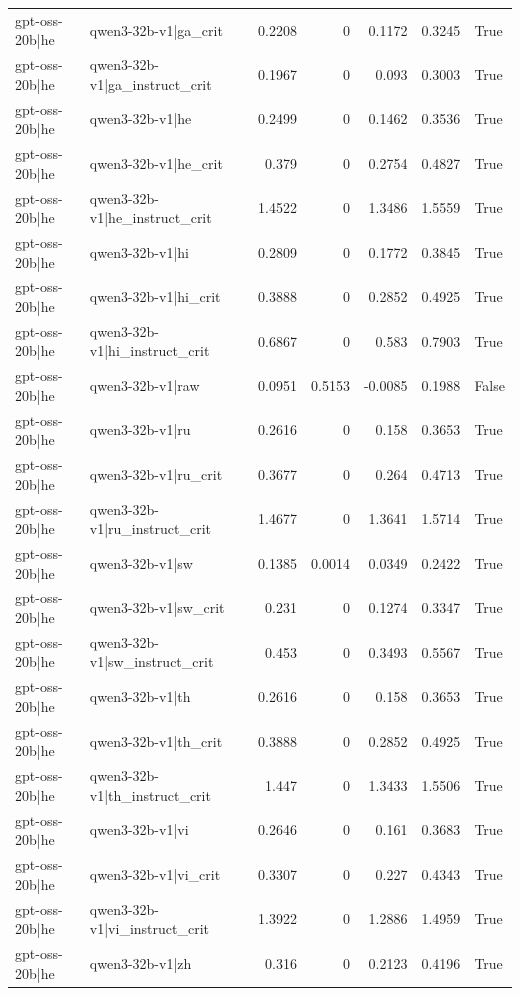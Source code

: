 \begin{table}
\begin{tabular}{l l r r r r l}
gpt-oss-20b|he & qwen3-32b-v1|ga_crit & 0.2208 & 0 & 0.1172 & 0.3245 & True \\
gpt-oss-20b|he & qwen3-32b-v1|ga_instruct_crit & 0.1967 & 0 & 0.093 & 0.3003 & True \\
gpt-oss-20b|he & qwen3-32b-v1|he & 0.2499 & 0 & 0.1462 & 0.3536 & True \\
gpt-oss-20b|he & qwen3-32b-v1|he_crit & 0.379 & 0 & 0.2754 & 0.4827 & True \\
gpt-oss-20b|he & qwen3-32b-v1|he_instruct_crit & 1.4522 & 0 & 1.3486 & 1.5559 & True \\
gpt-oss-20b|he & qwen3-32b-v1|hi & 0.2809 & 0 & 0.1772 & 0.3845 & True \\
gpt-oss-20b|he & qwen3-32b-v1|hi_crit & 0.3888 & 0 & 0.2852 & 0.4925 & True \\
gpt-oss-20b|he & qwen3-32b-v1|hi_instruct_crit & 0.6867 & 0 & 0.583 & 0.7903 & True \\
gpt-oss-20b|he & qwen3-32b-v1|raw & 0.0951 & 0.5153 & -0.0085 & 0.1988 & False \\
gpt-oss-20b|he & qwen3-32b-v1|ru & 0.2616 & 0 & 0.158 & 0.3653 & True \\
gpt-oss-20b|he & qwen3-32b-v1|ru_crit & 0.3677 & 0 & 0.264 & 0.4713 & True \\
gpt-oss-20b|he & qwen3-32b-v1|ru_instruct_crit & 1.4677 & 0 & 1.3641 & 1.5714 & True \\
gpt-oss-20b|he & qwen3-32b-v1|sw & 0.1385 & 0.0014 & 0.0349 & 0.2422 & True \\
gpt-oss-20b|he & qwen3-32b-v1|sw_crit & 0.231 & 0 & 0.1274 & 0.3347 & True \\
gpt-oss-20b|he & qwen3-32b-v1|sw_instruct_crit & 0.453 & 0 & 0.3493 & 0.5567 & True \\
gpt-oss-20b|he & qwen3-32b-v1|th & 0.2616 & 0 & 0.158 & 0.3653 & True \\
gpt-oss-20b|he & qwen3-32b-v1|th_crit & 0.3888 & 0 & 0.2852 & 0.4925 & True \\
gpt-oss-20b|he & qwen3-32b-v1|th_instruct_crit & 1.447 & 0 & 1.3433 & 1.5506 & True \\
gpt-oss-20b|he & qwen3-32b-v1|vi & 0.2646 & 0 & 0.161 & 0.3683 & True \\
gpt-oss-20b|he & qwen3-32b-v1|vi_crit & 0.3307 & 0 & 0.227 & 0.4343 & True \\
gpt-oss-20b|he & qwen3-32b-v1|vi_instruct_crit & 1.3922 & 0 & 1.2886 & 1.4959 & True \\
gpt-oss-20b|he & qwen3-32b-v1|zh & 0.316 & 0 & 0.2123 & 0.4196 & True \\

\end{tabular}
\end{table}
